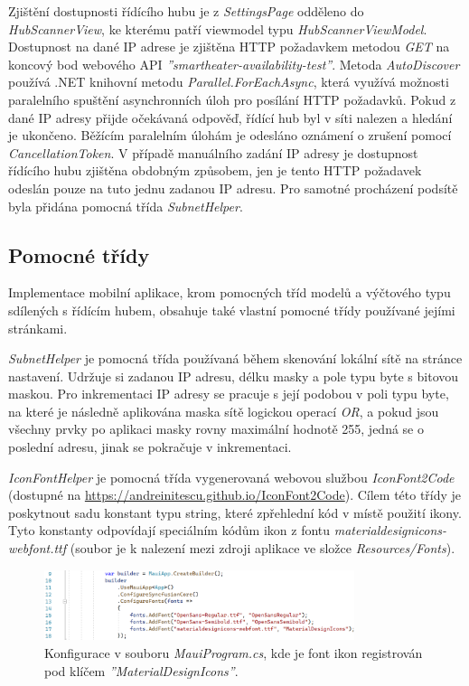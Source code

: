 Zjištění dostupnosti řídícího hubu je z {\it SettingsPage} odděleno do {\it HubScannerView}, ke kterému patří viewmodel typu {\it HubScannerViewModel}. Dostupnost na dané IP adrese je zjištěna HTTP požadavkem metodou {\it GET} na koncový bod webového API {\it ''smartheater-availability-test''}. Metoda {\it AutoDiscover} používá .NET knihovní metodu {\it Parallel.ForEachAsync}, která využívá možnosti paralelního spuštění asynchronních úloh pro posílání HTTP požadavků. Pokud z dané IP adresy přijde očekávaná odpověď, řídící hub byl v síti nalezen a hledání je ukončeno. Běžícím paralelním úlohám je odesláno oznámení o zrušení pomocí {\it CancellationToken}. V případě manuálního zadání IP adresy je dostupnost řídícího hubu zjištěna obdobným způsobem, jen je tento HTTP požadavek odeslán pouze na tuto jednu zadanou IP adresu. Pro samotné procházení podsítě byla přidána pomocná třída {\it SubnetHelper}.

\subsection{Pomocné třídy}
Implementace mobilní aplikace, krom pomocných tříd modelů a výčtového typu sdílených s řídícím hubem, obsahuje také vlastní pomocné třídy používané jejími stránkami.

{\it SubnetHelper} je pomocná třída používaná během skenování lokální sítě na stránce nastavení. Udržuje si zadanou IP adresu, délku masky a pole typu byte s bitovou maskou. Pro inkrementaci IP adresy se pracuje s její podobou v poli typu byte, na které je následně aplikována maska sítě logickou operací {\it OR}, a pokud jsou všechny prvky po aplikaci masky rovny maximální hodnotě 255, jedná se o poslední adresu, jinak se pokračuje v inkrementaci.

{\it IconFontHelper} je pomocná třída vygenerovaná webovou službou {\it IconFont2Code} (dostupné na \url{https://andreinitescu.github.io/IconFont2Code}). Cílem této třídy je poskytnout sadu konstant typu string, které zpřehlední kód v místě použití ikony. Tyto konstanty odpovídají speciálním kódům ikon z fontu {\it materialdesignicons-webfont.ttf} (soubor je k nalezení mezi zdroji aplikace ve složce {\it Resources/Fonts}).

\begin{figure}[hbt]
\includegraphics[width=0.81\textwidth]{obrazky-figures/code-mauiprogram.png}
\caption{Konfigurace v souboru {\it MauiProgram.cs}, kde je font ikon registrován pod klíčem {\it ''MaterialDesignIcons''}.}
\end{figure}

